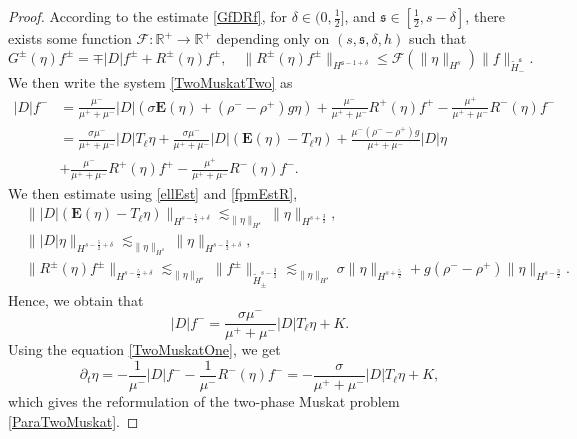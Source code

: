 \documentclass[12pt]{amsart}
\theoremstyle{definition}
\numberwithin{equation}{section}
\newcommand{\p}{\partial}
\newcommand{\R}{\mathbb{R}}
\newcommand{\f}{\frac}
\begin{document}
\begin{proof}
According to the estimate \eqref{GfDRf}, for $\delta \in (0,\f12]$, and $\mathfrak{s} \in [\f12, s-\delta]$, there exists some function $\mathcal{F}:\R^+ \rightarrow \R^+$ depending only on $(s,\mathfrak{s}, \delta, h)$ such that
\begin{equation*} 
G^\pm(\eta)f^\pm = \mp|D|f^\pm + R^\pm(\eta)f^\pm, \quad \| R^\pm(\eta)f^\pm\|_{H^{\mathfrak{s}- 1+\delta}} \leq \mathcal{F}(\|\eta\|_{H^s}) \|f\|_{\tilde{H}^\mathfrak{s}_-}.
\end{equation*}
 We then write the system \eqref{TwoMuskatTwo} as 
\begin{align*}
 |D|f^- &= \frac{\mu^-}{\mu^+ + \mu^-} |D|(\sigma \mathbf{E}(\eta)+ (\rho^- - \rho^+)g\eta) + \frac{\mu^-}{\mu^+ + \mu^-}R^+(\eta)f^+ - \frac{\mu^+}{\mu^+ + \mu^-}R^-(\eta)f^- \\
 &= \frac{\sigma\mu^-}{\mu^+ + \mu^-} |D|T_\ell \eta + \frac{\sigma\mu^-}{\mu^+ + \mu^-} |D|(\mathbf{E}(\eta)-T_\ell \eta) + \frac{\mu^-  (\rho^- - \rho^+)g}{\mu^+ + \mu^-} |D|\eta\\
 &+ \frac{\mu^-}{\mu^+ + \mu^-}R^+(\eta)f^+ - \frac{\mu^+}{\mu^+ + \mu^-}R^-(\eta)f^-.
\end{align*}
We then estimate using \eqref{ellEst} and \eqref{fpmEstR},
\begin{align*}
 &\| |D|(\mathbf{E}(\eta)-T_\ell \eta)\|_{H^{s-\f52 + \delta}} \lesssim_{\|\eta\|_{H^s}} \|\eta\|_{H^{s+\f32}}, \\
 & \||D|\eta \|_{H^{s-\f52 + \delta}} \lesssim_{\|\eta\|_{H^s}} \|\eta\|_{H^{s-\f32+\delta}}, \\
 & \|R^\pm(\eta) f^\pm\|_{H^{s-\f52+\delta}}\lesssim_{\|\eta\|_{H^s}}\|f^\pm\|_{\tilde{H}_\pm^{s-\f32}} \lesssim_{\|\eta\|_{H^s}}  \sigma \|\eta\|_{H^{s+\f52}} + g(\rho^- - \rho^+)\|\eta\|_{H^{s-\f32}}.
\end{align*}
Hence, we obtain that
\begin{equation*}
|D|f^- = \frac{\sigma\mu^-}{\mu^+ + \mu^-} |D|T_\ell \eta  + K.
\end{equation*}
Using the equation \eqref{TwoMuskatOne}, we get
\begin{equation*}
\p_t \eta = -\frac{1}{\mu^-}|D|f^- -\frac{1}{\mu^-}R^-(\eta)f^- = -\frac{\sigma}{\mu^+ +\mu^{-}} |D|T_\ell \eta + K,
\end{equation*}
which gives the reformulation of the two-phase Muskat problem \eqref{ParaTwoMuskat}.
\end{proof}
\end{document}
